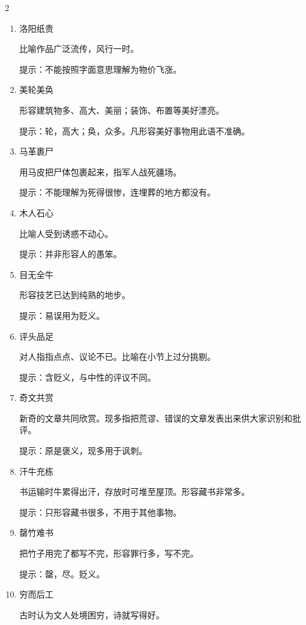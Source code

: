 \documentclass[final,oneside]{ctexbook}
\begin{document}
\begin{multicols}{2}
\begin{enumerate}
    \item 洛阳纸贵

      比喻作品广泛流传，风行一时。

      提示：不能按照字面意思理解为物价飞涨。

    \item 美轮美奂

      形容建筑物多、高大、美丽；装饰、布置等美好漂亮。

      提示：轮，高大；奂，众多。凡形容美好事物用此语不准确。

    \item 马革裹尸

      用马皮把尸体包裹起来，指军人战死疆场。

      提示：不能理解为死得很惨，连埋葬的地方都没有。

    \item 木人石心

      比喻人受到诱惑不动心。

      提示：并非形容人的愚笨。

    \item 目无全牛

      形容技艺已达到纯熟的地步。

      提示：易误用为贬义。

    \item 评头品足

      对人指指点点、议论不已。比喻在小节上过分挑剔。

      提示：含贬义，与中性的评议不同。

    \item 奇文共赏

      新奇的文章共同欣赏。现多指把荒谬、错误的文章发表出来供大家识别和批评。

      提示：原是褒义，现多用于讽刺。

    \item 汗牛充栋

      书运输时牛累得出汗，存放时可堆至屋顶。形容藏书非常多。

      提示：只形容藏书很多，不用于其他事物。

    \item 罄竹难书

      把竹子用完了都写不完，形容罪行多，写不完。

      提示：罄，尽。贬义。

    \item 穷而后工

      古时认为文人处境困穷，诗就写得好。


\end{enumerate}
\end{multicols}
\end{document}
